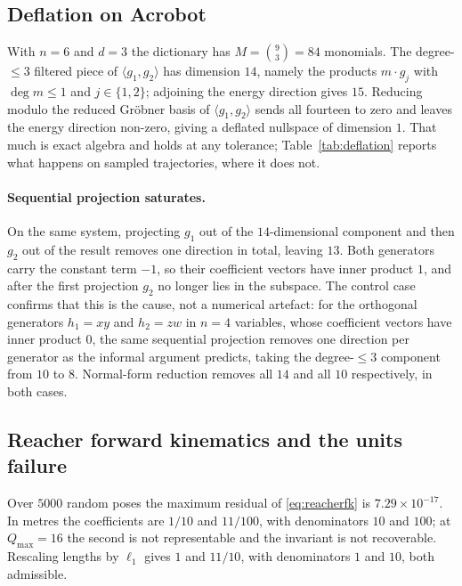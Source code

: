 \documentclass{article}
\begin{document}
\subsection{Deflation on Acrobot}
\label{app:deflation}
With $n = 6$ and $d = 3$ the dictionary has $M = \binom{9}{3} = 84$ monomials.
The degree-$\le 3$ filtered piece of $\langle g_1, g_2\rangle$ has dimension
$14$, namely the products $m \cdot g_j$ with $\deg m \le 1$ and
$j \in \{1,2\}$; adjoining the energy direction gives $15$. Reducing modulo the
reduced Gr\"obner basis of $\langle g_1, g_2\rangle$ sends all fourteen to zero
and leaves the energy direction non-zero, giving a deflated nullspace of
dimension $1$. That much is exact algebra and holds at any tolerance;
Table~\ref{tab:deflation} reports what happens on sampled trajectories, where
it does not.

\paragraph{Sequential projection saturates.} On the same system, projecting
$g_1$ out of the $14$-dimensional component and then $g_2$ out of the result
removes one direction in total, leaving $13$. Both generators carry the
constant term $-1$, so their coefficient vectors have inner product $1$, and
after the first projection $g_2$ no longer lies in the subspace. The control
case confirms that this is the cause, not a numerical artefact: for the
orthogonal generators $h_1 = xy$ and $h_2 = zw$ in $n = 4$ variables, whose
coefficient vectors have inner product $0$, the same sequential projection
removes one direction per generator as the informal argument predicts, taking
the degree-$\le 3$ component from $10$ to $8$. Normal-form reduction removes all
$14$ and all $10$ respectively, in both cases.

\subsection{Reacher forward kinematics and the units failure}
\label{app:reacher}
Over $5000$ random poses the maximum residual of \eqref{eq:reacherfk} is
$7.29\times10^{-17}$. In metres the coefficients are $1/10$ and $11/100$, with
denominators $10$ and $100$; at $Q_{\max}=16$ the second is not representable
and the invariant is not recoverable. Rescaling lengths by $\ell_1$ gives $1$
and $11/10$, with denominators $1$ and $10$, both admissible.
\end{document}
